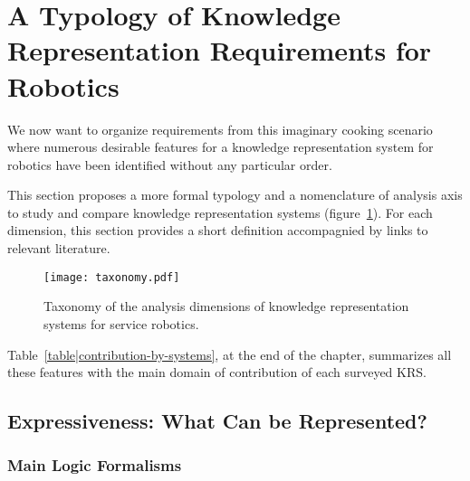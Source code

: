 \section{A Typology of Knowledge Representation Requirements for Robotics}
\label{sect|features}
We now want to organize requirements from this imaginary cooking scenario where
numerous desirable features for a knowledge representation system for robotics
have been identified without any particular order.

This section proposes a more formal typology and a nomenclature of analysis
axis to study and compare knowledge representation systems
(figure~\ref{fig|taxo}). For each dimension, this section provides a short
definition accompagnied by links to relevant literature.

\begin{figure}
        \centering
        \texttt{[image: taxonomy.pdf]}
        \caption{Taxonomy of the analysis dimensions of knowledge
        representation systems for service robotics.}
        \label{fig|taxo}
\end{figure}

Table~\ref{table|contribution-by-systems}, at the end of the chapter,
summarizes all these features with the main domain of contribution of each
surveyed KRS.


\subsection{Expressiveness: What Can be Represented?}
\label{sect|expressiveness}

\begin{scriptsize}
\begin{center}
\end{center}
\end{scriptsize}


\subsubsection{Main Logic Formalisms}


